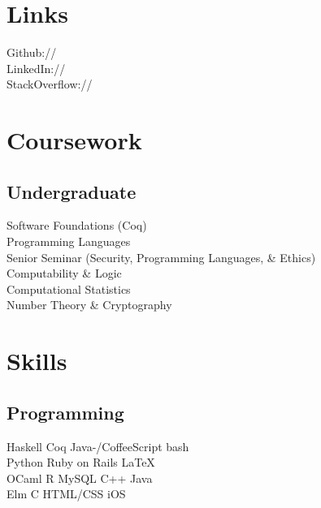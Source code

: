 \documentclass[]{deedy-resume-openfont}
\begin{document}
\begin{minipage}[t]{0.33\textwidth}
\section{Links} 
Github:// \href{https://github.com/ericthewry}{} \\
LinkedIn://  \href{https://www.linkedin.com/in/eric-campbell-ba339490/}{} \\
StackOverflow:// \href{https://stackoverflow.com/users/8202530/ericthewry}{}
\sectionsep


\section{Coursework}

\subsection{Undergraduate}
Software Foundations (Coq) \\
Programming Languages \\
Senior Seminar (Security, Programming Languages, \& Ethics) \\
Computability \& Logic \\
Computational Statistics \\
Number Theory \& Cryptography
\sectionsep


\section{Skills}
\subsection{Programming}
Haskell \textbullet{} Coq \textbullet{} Java-/CoffeeScript \textbullet{} bash  \\
Python \textbullet{} Ruby on Rails \textbullet{} \LaTeX\ \\ 
OCaml \textbullet{} R \textbullet{} MySQL \textbullet{} C++ \textbullet{} Java \\
Elm \textbullet{} C  \textbullet{} HTML/CSS  \textbullet{} iOS
\sectionsep


\end{minipage}
\end{document}
